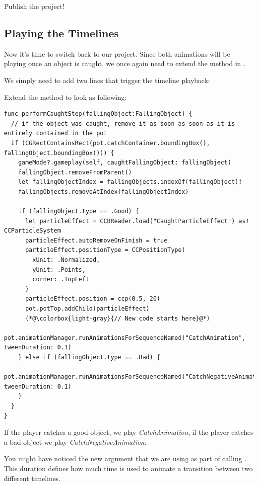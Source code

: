 \begin{leftbar}
Publish the \SB{} project!
\end{leftbar}

\subsection{Playing the Timelines}
Now it's time to switch back to our \xcode{} project. Since both animations
will be playing once an object is caught, we once again need to extend the
 method in
.

We simply need to add two lines that trigger the timeline playback:
\begin{leftbar}
Extend the  method to look as
following:
\begin{lstlisting}
func performCaughtStep(fallingObject:FallingObject) {
  // if the object was caught, remove it as soon as soon as it is entirely contained in the pot
  if (CGRectContainsRect(pot.catchContainer.boundingBox(), fallingObject.boundingBox())) {
    gameMode?.gameplay(self, caughtFallingObject: fallingObject)
    fallingObject.removeFromParent()
    let fallingObjectIndex = fallingObjects.indexOf(fallingObject)!
    fallingObjects.removeAtIndex(fallingObjectIndex)
    
    if (fallingObject.type == .Good) {
      let particleEffect = CCBReader.load("CaughtParticleEffect") as! CCParticleSystem
      particleEffect.autoRemoveOnFinish = true
      particleEffect.positionType = CCPositionType(
        xUnit: .Normalized,
        yUnit: .Points,
        corner: .TopLeft
      )
      particleEffect.position = ccp(0.5, 20)
      pot.potTop.addChild(particleEffect)
      (*@\colorbox{light-gray}{// New code starts here}@*)
      pot.animationManager.runAnimationsForSequenceNamed("CatchAnimation", tweenDuration: 0.1)
    } else if (fallingObject.type == .Bad) {
      pot.animationManager.runAnimationsForSequenceNamed("CatchNegativeAnimation", tweenDuration: 0.1)
    }
  }
}
\end{lstlisting}
\end{leftbar}

If the player catches a good object, we play \textit{CatchAnimation}, if the
player catches a bad object we play \textit{CatchNegativeAnimation}.

You might have noticed the new  argument that we are
using as part of calling . This
duration defines how much time is used to animate a transition between two
different timelines.

